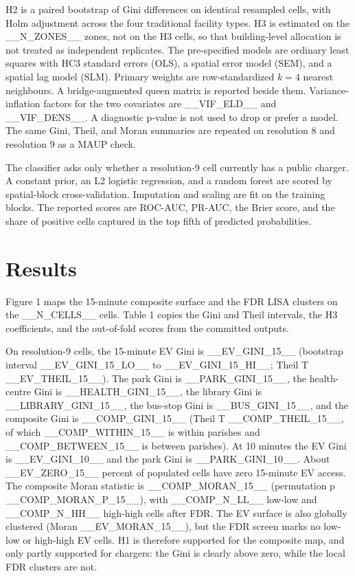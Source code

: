 \documentclass[11pt,a4paper]{article}
\begin{document}
H2 is a paired bootstrap of Gini differences on identical resampled cells, with Holm adjustment across the four traditional facility types. H3 is estimated on the __N_ZONES__ zones, not on the H3 cells, so that building-level allocation is not treated as independent replicates. The pre-specified models are ordinary least squares with HC3 standard errors (OLS), a spatial error model (SEM), and a spatial lag model (SLM). Primary weights are row-standardized $k=4$ nearest neighbours. A bridge-augmented queen matrix is reported beside them. Variance-inflation factors for the two covariates are __VIF_ELD__ and __VIF_DENS__. A diagnostic p-value is not used to drop or prefer a model. The same Gini, Theil, and Moran summaries are repeated on resolution 8 and resolution 9 as a MAUP check.

The classifier asks only whether a resolution-9 cell currently has a public charger. A constant prior, an L2 logistic regression, and a random forest are scored by spatial-block cross-validation. Imputation and scaling are fit on the training blocks. The reported scores are ROC-AUC, PR-AUC, the Brier score, and the share of positive cells captured in the top fifth of predicted probabilities.

\section{Results}
Figure 1 maps the 15-minute composite surface and the FDR LISA clusters on the __N_CELLS__ cells. Table 1 copies the Gini and Theil intervals, the H3 coefficients, and the out-of-fold scores from the committed outputs.

On resolution-9 cells, the 15-minute EV Gini is __EV_GINI_15__ (bootstrap interval __EV_GINI_15_LO__ to __EV_GINI_15_HI__; Theil T __EV_THEIL_15__). The park Gini is __PARK_GINI_15__, the health-centre Gini is __HEALTH_GINI_15__, the library Gini is __LIBRARY_GINI_15__, the bus-stop Gini is __BUS_GINI_15__, and the composite Gini is __COMP_GINI_15__ (Theil T __COMP_THEIL_15__, of which __COMP_WITHIN_15__ is within parishes and __COMP_BETWEEN_15__ is between parishes). At 10 minutes the EV Gini is __EV_GINI_10__ and the park Gini is __PARK_GINI_10__. About __EV_ZERO_15__ percent of populated cells have zero 15-minute EV access. The composite Moran statistic is __COMP_MORAN_15__ (permutation p __COMP_MORAN_P_15__), with __COMP_N_LL__ low-low and __COMP_N_HH__ high-high cells after FDR. The EV surface is also globally clustered (Moran __EV_MORAN_15__), but the FDR screen marks no low-low or high-high EV cells. H1 is therefore supported for the composite map, and only partly supported for chargers: the Gini is clearly above zero, while the local FDR clusters are not.
\end{document}
